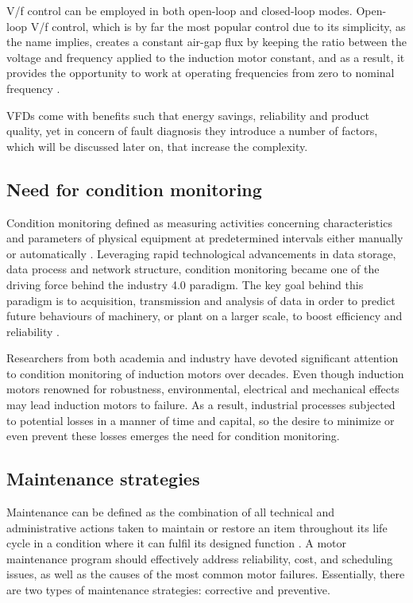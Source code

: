 V/f control can be employed in both open-loop and closed-loop modes. Open-loop V/f control, which is by far the most popular control due to its simplicity, as the name implies, creates a constant air-gap flux by keeping the ratio between the voltage and frequency applied to the induction motor constant, and as a result, it provides the opportunity to work at operating frequencies from zero to nominal frequency \cite{bose2002modern}. 

VFDs come with benefits such that energy savings, reliability and product quality, yet in concern of fault diagnosis they introduce a number of factors, which will be discussed later on, that increase the complexity. 

\subsection{Need for condition monitoring}

Condition monitoring defined as measuring activities concerning characteristics and parameters of physical equipment at predetermined intervals either manually or automatically \cite{en201713306}. Leveraging rapid technological advancements in data storage, data process and network structure, condition monitoring became one of the driving force behind the industry 4.0 paradigm. The key goal behind this paradigm is to acquisition, transmission and analysis of data in order to predict future behaviours of machinery, or plant on a larger scale, to boost efficiency and reliability \cite{lughofer2019prologue,RUIZSARMIENTO}. 

Researchers from both academia and industry have devoted significant attention to condition monitoring of induction motors over decades. Even though induction motors renowned for robustness, environmental, electrical and mechanical effects may lead induction motors to failure. As a result, industrial processes subjected to potential losses in a manner of time and capital, so the desire to minimize or even prevent these losses emerges the need for condition monitoring. 

\subsection{Maintenance strategies}

Maintenance can be defined as the combination of all technical and administrative actions taken to maintain or restore an item throughout its life cycle in a condition where it can fulfil its designed function \cite{en201713306}. A motor maintenance program should effectively address reliability, cost, and scheduling issues, as well as the causes of the most common motor failures. Essentially, there are two types of maintenance strategies: corrective and preventive. 

